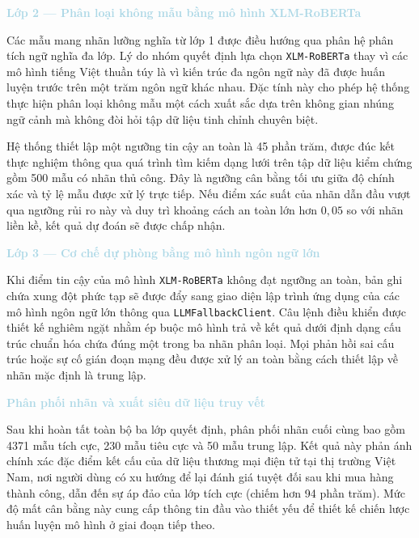 \vspace{0.5em}
\noindent\textcolor{lightblue}{\textbf{Lớp 2 --- Phân loại không mẫu bằng mô hình XLM-RoBERTa}}
\vspace{0.5em}

Các mẫu mang nhãn lưỡng nghĩa từ lớp 1 được điều hướng qua phân hệ phân tích ngữ nghĩa đa lớp. Lý do nhóm quyết định lựa chọn \texttt{XLM-RoBERTa} thay vì các mô hình tiếng Việt thuần túy là vì kiến trúc đa ngôn ngữ này đã được huấn luyện trước trên một trăm ngôn ngữ khác nhau. Đặc tính này cho phép hệ thống thực hiện phân loại không mẫu một cách xuất sắc dựa trên không gian nhúng ngữ cảnh mà không đòi hỏi tập dữ liệu tinh chỉnh chuyên biệt.

Hệ thống thiết lập một ngưỡng tin cậy an toàn là 45 phần trăm, được đúc kết thực nghiệm thông qua quá trình tìm kiếm dạng lưới trên tập dữ liệu kiểm chứng gồm 500 mẫu có nhãn thủ công. Đây là ngưỡng cân bằng tối ưu giữa độ chính xác và tỷ lệ mẫu được xử lý trực tiếp. Nếu điểm xác suất của nhãn dẫn đầu vượt qua ngưỡng rủi ro này và duy trì khoảng cách an toàn lớn hơn $0{,}05$ so với nhãn liền kề, kết quả dự đoán sẽ được chấp nhận.

\vspace{0.5em}
\noindent\textcolor{lightblue}{\textbf{Lớp 3 --- Cơ chế dự phòng bằng mô hình ngôn ngữ lớn}}
\vspace{0.5em}

Khi điểm tin cậy của mô hình \texttt{XLM-RoBERTa} không đạt ngưỡng an toàn, bản ghi chứa xung đột phức tạp sẽ được đẩy sang giao diện lập trình ứng dụng của các mô hình ngôn ngữ lớn thông qua \texttt{LLMFallbackClient}. Câu lệnh điều khiển được thiết kế nghiêm ngặt nhằm ép buộc mô hình trả về kết quả dưới định dạng cấu trúc chuẩn hóa chứa đúng một trong ba nhãn phân loại. Mọi phản hồi sai cấu trúc hoặc sự cố gián đoạn mạng đều được xử lý an toàn bằng cách thiết lập về nhãn mặc định là trung lập.

\vspace{0.5em}
\noindent\textcolor{lightblue}{\textbf{Phân phối nhãn và xuất siêu dữ liệu truy vết}}
\vspace{0.5em}

Sau khi hoàn tất toàn bộ ba lớp quyết định, phân phối nhãn cuối cùng bao gồm 4371 mẫu tích cực, 230 mẫu tiêu cực và 50 mẫu trung lập. Kết quả này phản ánh chính xác đặc điểm kết cấu của dữ liệu thương mại điện tử tại thị trường Việt Nam, nơi người dùng có xu hướng để lại đánh giá tuyệt đối sau khi mua hàng thành công, dẫn đến sự áp đảo của lớp tích cực (chiếm hơn 94 phần trăm). Mức độ mất cân bằng này cung cấp thông tin đầu vào thiết yếu để thiết kế chiến lược huấn luyện mô hình ở giai đoạn tiếp theo.

